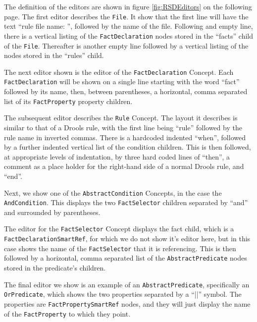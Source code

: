 The definition of the editors are shown in figure \ref{fig:RSDEditors} on the following page.
The first editor describes the \texttt{File}. 
It show that the first line will have the text ``rule file name: '', followed by the name of the file.
Following and empty line, there is a vertical listing of the \texttt{FactDeclaration} nodes stored in the ``facts'' child of the \texttt{File}.
Thereafter is another empty line followed by a vertical listing of the  nodes stored in the ``rules'' child.

The next editor shown is the editor of the \texttt{FactDeclaration} Concept.
Each \texttt{FactDeclaration} will be shown on a single line starting with the word ``fact'' followed by its name, then, between parentheses, a horizontal, comma separated list of its \texttt{FactProperty} property children.

The subsequent editor describes the \texttt{Rule} Concept. 
The layout it describes is similar to that of a Drools rule, with the first line being ``rule'' followed by the rule name in inverted commas.
There is a hardcoded indented ``when'', followed by a further indented vertical list of the condition children.
This is then followed, at appropriate levels of indentation, by three hard coded lines of ``then'', a comment as a place holder for the right-hand side of a normal Drools rule, and ``end''.

Next, we show one of the \texttt{AbstractCondition} Concepts, in the case the \texttt{AndCondition}.
This displays the two \texttt{FactSelector} children separated by ``and'' and surrounded by parentheses.

The editor for the \texttt{FactSelector} Concept displays the fact child, which is a \texttt{FactDeclarationSmartRef}, for which we do not show it's editor here, but in this case shows the name of the \texttt{FactSelector} that it is referencing.
This is then followed by a horizontal, comma separated list of the \texttt{AbstractPredicate} nodes stored in the predicate's children.

The final editor we show is an example of an \texttt{AbstractPredicate}, specifically an \texttt{OrPredicate}, which shows the two properties separated by a ``||'' symbol.
The properties are \texttt{FactPropertySmartRef} nodes, and they will just display the name of the \texttt{FactProperty} to which they point.

